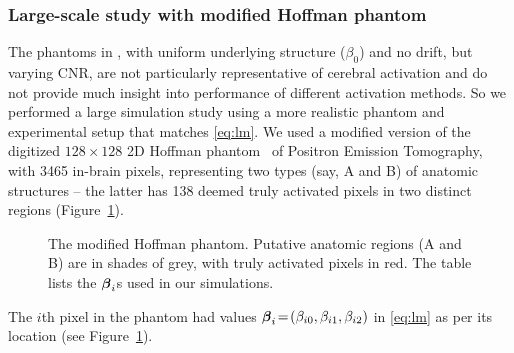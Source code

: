 \subsubsection{Large-scale study with modified Hoffman phantom}
\label{hoff}
The phantoms in \citet{polzehletal10}, with uniform underlying
structure ($\beta_0$) and no drift, but varying CNR, are not particularly
representative of cerebral activation and do not provide much
insight into performance of different activation methods. So we
performed a large 
simulation study using a more realistic phantom and experimental setup
that matches \eqref{eq:lm}. 
We used a modified version of the digitized
$128\!\times\!128$ 2D Hoffman phantom~\citep{hoffmanetal90}  of
Positron Emission Tomography, with 
 3465 in-brain pixels, representing two types (say, A and B) of
anatomic structures -- the latter has 138 deemed truly activated  pixels in  two
distinct regions (Figure~\ref{fig:Hoff}).  
\begin{figure}[h]
    \centering
    \caption{The modified Hoffman phantom. Putative anatomic  regions (A and B) are in
      shades of grey, with truly activated pixels  in red. The
      table lists the $\boldsymbol{\beta}_i$s used in our simulations.}
\label{fig:Hoff}
\end{figure}
The $i$th pixel in the phantom had values 
$\boldsymbol{\beta}_i\!=\!(\beta_{i0},\beta_{i1},\beta_{i2})$ in \eqref{eq:lm} as
per its location (see Figure~\ref{fig:Hoff}).

